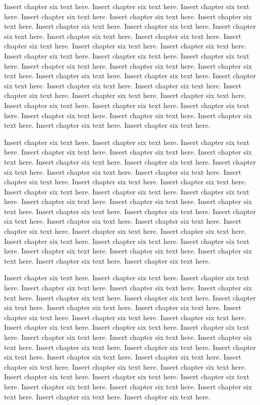 Insert chapter six text here. Insert chapter six text here. Insert chapter six text here. Insert chapter six text here. Insert chapter six text here. Insert chapter six text here. Insert chapter six text here. Insert chapter six text here. Insert chapter six text here. Insert chapter six text here. Insert chapter six text here. Insert chapter six text here. Insert chapter six text here. Insert chapter six text here. Insert chapter six text here. Insert chapter six text here. Insert chapter six text here. Insert chapter six text here. Insert chapter six text here. Insert chapter six text here. Insert chapter six text here. Insert chapter six text here. Insert chapter six text here. Insert chapter six text here. Insert chapter six text here. Insert chapter six text here. Insert chapter six text here. Insert chapter six text here. Insert chapter six text here. Insert chapter six text here. Insert chapter six text here. Insert chapter six text here. Insert chapter six text here. Insert chapter six text here. Insert chapter six text here. Insert chapter six text here.

Insert chapter six text here. Insert chapter six text here. Insert chapter six text here. Insert chapter six text here. Insert chapter six text here. Insert chapter six text here. Insert chapter six text here. Insert chapter six text here. Insert chapter six text here. Insert chapter six text here. Insert chapter six text here. Insert chapter six text here. Insert chapter six text here. Insert chapter six text here. Insert chapter six text here. Insert chapter six text here. Insert chapter six text here. Insert chapter six text here. Insert chapter six text here. Insert chapter six text here. Insert chapter six text here. Insert chapter six text here. Insert chapter six text here. Insert chapter six text here. Insert chapter six text here. Insert chapter six text here. Insert chapter six text here. Insert chapter six text here. Insert chapter six text here. Insert chapter six text here. Insert chapter six text here. Insert chapter six text here. Insert chapter six text here. Insert chapter six text here. Insert chapter six text here. Insert chapter six text here.

Insert chapter six text here. Insert chapter six text here. Insert chapter six text here. Insert chapter six text here. Insert chapter six text here. Insert chapter six text here. Insert chapter six text here. Insert chapter six text here. Insert chapter six text here. Insert chapter six text here. Insert chapter six text here. Insert chapter six text here. Insert chapter six text here. Insert chapter six text here. Insert chapter six text here. Insert chapter six text here. Insert chapter six text here. Insert chapter six text here. Insert chapter six text here. Insert chapter six text here. Insert chapter six text here. Insert chapter six text here. Insert chapter six text here. Insert chapter six text here. Insert chapter six text here. Insert chapter six text here. Insert chapter six text here. Insert chapter six text here. Insert chapter six text here. Insert chapter six text here. Insert chapter six text here. Insert chapter six text here. Insert chapter six text here. Insert chapter six text here. Insert chapter six text here. Insert chapter six text here.

